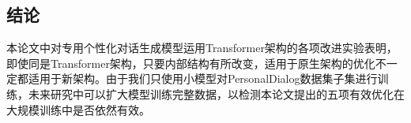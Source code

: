 \documentclass[letterpaper]{article} %
\begin{document}
\begin{CJK*}{UTF8}{gbsn}
\section[Conclusion]{结论} 
本论文中对专用个性化对话生成模型运用Transformer架构的各项改进实验表明，即使同是Transformer架构，只要内部结构有所改变，适用于原生架构的优化不一定都适用于新架构。由于我们只使用小模型对PersonalDialog数据集子集进行训练，未来研究中可以扩大模型训练完整数据，以检测本论文提出的五项有效优化在大规模训练中是否依然有效。




\clearpage\end{CJK*}
\end{document}
